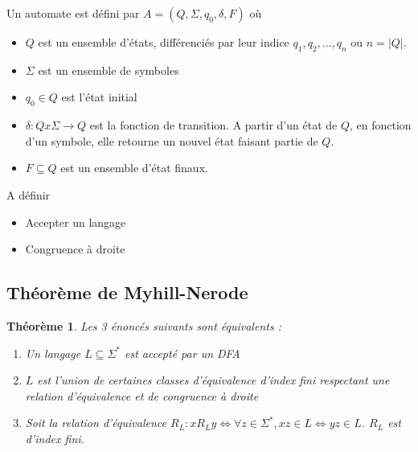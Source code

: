 \documentclass[french,letterpaper, 12pt]{article}
\newtheorem{theorem}{Théorème}[section]
\begin{document}
	
	Un automate est défini par $A = (Q, \Sigma, q_0, \delta, F)$ où
	\begin{itemize}
		\item $Q$ est un ensemble d'états, différenciés par leur indice $q_1, q_2, ..., q_n$ ou $n = |Q|$.
		\item $\Sigma$ est un ensemble de symboles
		\item $q_0 \in Q$ est l'état initial
		\item $\delta : Q x \Sigma \rightarrow Q$ est la fonction de transition. A partir d'un état de $Q$, en fonction d'un symbole, elle retourne un nouvel état faisant partie de $Q$.
		\item $F \subseteq Q$ est un ensemble d'état finaux.
	\end{itemize}
	 
	 A définir
	 \begin{itemize}
	 	\item Accepter un langage
	 	\item Congruence à droite
	 \end{itemize}
	 
	\subsection{Théorème de Myhill-Nerode}
	
	\begin{theorem}
		Les 3 énoncés suivants sont équivalents :
		\begin{enumerate}
			\item Un langage $L\subseteq\Sigma^*$ est accepté par un DFA
			\item $L$ est l'union de certaines classes d'équivalence d'index fini respectant une relation d'équivalence et de congruence à droite
			\item Soit la relation d'équivalence $R_L : xR_Ly \Leftrightarrow \forall z \in \Sigma^*, xz \in L \Leftrightarrow yz \in L$. $R_L$ est d'index fini.
		\end{enumerate}
	\end{theorem}
	
\end{document}
